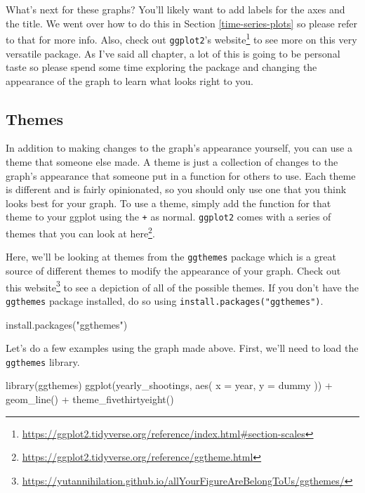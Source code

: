 \documentclass[
]{krantz}
\makeatletter
\newenvironment{Shaded}{\begin{snugshade}}{\end{snugshade}}
\newcommand{\AttributeTok}[1]{\textcolor[rgb]{0.61,0.61,0.61}{#1}}
\newcommand{\FunctionTok}[1]{\textcolor[rgb]{0,0,0}{#1}}
\newcommand{\NormalTok}[1]{#1}
\newcommand{\SpecialCharTok}[1]{\textcolor[rgb]{0,0,0}{#1}}
\newcommand{\StringTok}[1]{\textcolor[rgb]{0.5,0.5,0.5}{#1}}
\renewcommand{\href}[2]{#2\footnote{\url{#1}}}
\newenvironment{kframe}{%
\medskip{}
\setlength{\fboxsep}{.8em}
 \def\at@end@of@kframe{}%
 \ifinner\ifhmode%
  \def\at@end@of@kframe{\end{minipage}}%
  \begin{minipage}{\columnwidth}%
 \fi\fi%
 \def\FrameCommand##1{\hskip\@totalleftmargin \hskip-\fboxsep
 \colorbox{shadecolor}{##1}\hskip-\fboxsep
     \hskip-\linewidth \hskip-\@totalleftmargin \hskip\columnwidth}%
 \MakeFramed {\advance\hsize-\width
   \@totalleftmargin\z@ \linewidth\hsize
   \@setminipage}}%
 {\par\unskip\endMakeFramed%
 \at@end@of@kframe}
\renewenvironment{Shaded}{\begin{kframe}}{\end{kframe}}
\makeatother
\begin{document}
What's next for these graphs? You'll likely want to add
labels for the axes and the title. We went over how to do
this in Section \ref{time-series-plots} so please refer to
that for more info. Also, check out \texttt{ggplot2}'s
\href{https://ggplot2.tidyverse.org/reference/index.html\#section-scales}{website}
to see more on this very versatile package. As I've said all
chapter, a lot of this is going to be personal taste so
please spend some time exploring the package and changing
the appearance of the graph to learn what looks right to
you.

\hypertarget{themes}{%
\subsection{Themes}\label{themes}}

In addition to making changes to the graph's appearance
yourself, you can use a theme that someone else made. A
theme is just a collection of changes to the graph's
appearance that someone put in a function for others to use.
Each theme is different and is fairly opinionated, so you
should only use one that you think looks best for your
graph. To use a theme, simply add the function for that
theme to your ggplot using the \texttt{+} as normal.
\texttt{ggplot2} comes with a series of themes that you can
look at
\href{https://ggplot2.tidyverse.org/reference/ggtheme.html}{here}.

Here, we'll be looking at themes from the \texttt{ggthemes}
package which is a great source of different themes to
modify the appearance of your graph. Check out this
\href{https://yutannihilation.github.io/allYourFigureAreBelongToUs/ggthemes/}{website}
to see a depiction of all of the possible themes. If you
don't have the \texttt{ggthemes} package installed, do so
using \texttt{install.packages("ggthemes")}.

\begin{Shaded}
\begin{Highlighting}[]
\FunctionTok{install.packages}\NormalTok{(}\StringTok{"ggthemes"}\NormalTok{)}
\end{Highlighting}
\end{Shaded}

Let's do a few examples using the graph made above. First,
we'll need to load the \texttt{ggthemes} library.

\begin{Shaded}
\begin{Highlighting}[]
\FunctionTok{library}\NormalTok{(ggthemes)}
\FunctionTok{ggplot}\NormalTok{(yearly\_shootings, }\FunctionTok{aes}\NormalTok{(}
  \AttributeTok{x =}\NormalTok{ year,}
  \AttributeTok{y =}\NormalTok{ dummy}
\NormalTok{)) }\SpecialCharTok{+}
  \FunctionTok{geom\_line}\NormalTok{() }\SpecialCharTok{+}
  \FunctionTok{theme\_fivethirtyeight}\NormalTok{()}
\end{Highlighting}
\end{Shaded}
\end{document}
